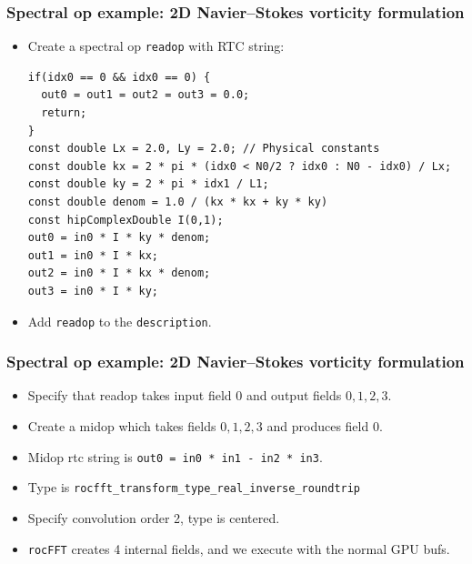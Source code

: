 \documentclass[10pt,aspectratio=169]{beamer}
\begin{document}
\begin{frame}[fragile]
  \frametitle{Spectral op example: 2D Navier--Stokes vorticity formulation}

  \begin{itemize}
  \item Create a spectral op \lstinline{readop} with RTC string:
    \begin{lstlisting}
if(idx0 == 0 && idx0 == 0) {
  out0 = out1 = out2 = out3 = 0.0;
  return;
}
const double Lx = 2.0, Ly = 2.0; // Physical constants
const double kx = 2 * pi * (idx0 < N0/2 ? idx0 : N0 - idx0) / Lx;
const double ky = 2 * pi * idx1 / L1;
const double denom = 1.0 / (kx * kx + ky * ky)
const hipComplexDouble I(0,1);
out0 = in0 * I * ky * denom;
out1 = in0 * I * kx;
out2 = in0 * I * kx * denom;
out3 = in0 * I * ky;
    \end{lstlisting}
  \item Add \lstinline{readop} to the \lstinline{description}.
  \end{itemize}

\end{frame}
  
\begin{frame}[fragile]
  \frametitle{Spectral op example: 2D Navier--Stokes vorticity formulation}
  \begin{itemize}
  \item Specify that readop takes input field 0 and output fields $0,1,2,3$.
  \item Create a midop which takes fields  $0,1,2,3$ and produces field 0.
  \item Midop rtc string is \lstinline{out0 = in0 * in1 - in2 * in3}.
  \item Type is \texttt{rocfft_transform_type_real_inverse_roundtrip}
  \item Specify convolution order 2, type is centered.
  \item \texttt{rocFFT} creates 4 internal fields, and we execute with the normal GPU bufs.
  \end{itemize}
  
\end{frame}



  
\end{document}
